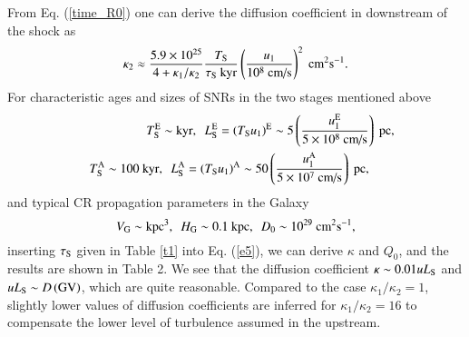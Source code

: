 \documentclass[apj]{emulateapj}
\begin{document}
From Eq. (\ref{time_R0}) one can derive the diffusion coefficient in downstream of the shock as
\begin{equation}
\kappa _2\approx \frac{5.9\times 10^{25}}{4+\kappa _1/\kappa _2}\frac{T_{\textrm{\scriptsize S}}}{\tau _{\textrm{\scriptsize S}}\ \textrm{kyr}}\left( \frac{u_1}{10^8\ \textrm{cm/s}} \right) ^2\ \textrm{cm}^2\textrm{s}^{-1}.\label{e5}
\end{equation}
For characteristic ages and sizes of SNRs in the two stages mentioned above
\begin{eqnarray}
&&T_\textrm{\scriptsize S}^\textrm{\scriptsize E}\sim\textrm{kyr},\ \ 
L_\textrm{\scriptsize S}^\textrm{\scriptsize E}=\left( T_\textrm{\scriptsize S}u_1\right) ^\textrm{\scriptsize E}\sim 5
\left(\frac{u_1^{\textrm{\scriptsize E}}}{5\times 10^8\ \textrm{cm/s}} \right) \ \textrm{pc},\nonumber\\
&&T_\textrm{\scriptsize S}^\textrm{\scriptsize A}\sim 100\ \textrm{kyr},\ \
L_\textrm{\scriptsize S}^\textrm{\scriptsize A}=\left( T_\textrm{\scriptsize S}u_1\right) ^\textrm{\scriptsize A}\sim 50
\left(\frac{u_1^{\textrm{\scriptsize A}}}{5\times10^7\ \textrm{cm/s}} \right) \ \textrm{pc},\ \ \ \ \ \ \ \ \label{e6}
\end{eqnarray}
and typical CR propagation parameters in the Galaxy
\begin{equation}
V_\textrm{\scriptsize G}\sim \textrm{kpc}^3,\ \ H_\textrm{\scriptsize G}\sim 0.1\ \textrm{kpc},\ \ D_0\sim 10^{29}\ \textrm{cm}^2\textrm{s}^{-1},\label{e7}
\end{equation}
inserting $ \tau_{\rm S} $ given in Table \ref{t1} into Eq. (\ref{e5}), we can derive $ \kappa $ and $ Q_0 $, and the results are shown in Table 2. 
We see that the diffusion coefficient $\kappa \sim 0.01 uL_{\rm S}$ and $uL_{\rm S}\sim D\left( {\rm GV}\right) $, which are quite reasonable. Compared to the case $ \kappa_1/\kappa_2=1 $, slightly lower values of diffusion coefficients are inferred for $ \kappa_1/\kappa_2=16 $ to compensate the lower level of turbulence assumed in the upstream.
\end{document}
